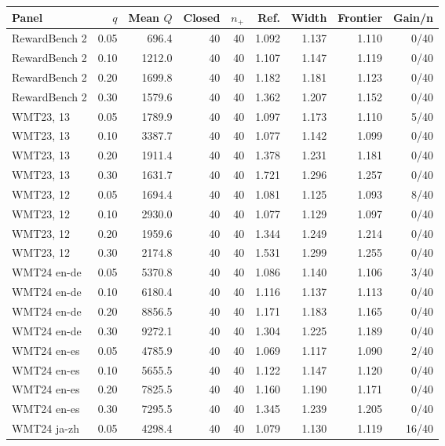 \begin{table}[t]
\centering\small
\setlength{\tabcolsep}{4pt}
\begin{tabular}{lrrrrrrrr}
\toprule
Panel & $q$ & Mean $Q$ & Closed & $n_+$ & Ref. & Width & Frontier & Gain/n \\
\midrule
RewardBench 2 & 0.05 & 696.4 & 40 & 40 & 1.092 & 1.137 & 1.110 & 0/40 \\
RewardBench 2 & 0.10 & 1212.0 & 40 & 40 & 1.107 & 1.147 & 1.119 & 0/40 \\
RewardBench 2 & 0.20 & 1699.8 & 40 & 40 & 1.182 & 1.181 & 1.123 & 0/40 \\
RewardBench 2 & 0.30 & 1579.6 & 40 & 40 & 1.362 & 1.207 & 1.152 & 0/40 \\
WMT23, 13 & 0.05 & 1789.9 & 40 & 40 & 1.097 & 1.173 & 1.110 & 5/40 \\
WMT23, 13 & 0.10 & 3387.7 & 40 & 40 & 1.077 & 1.142 & 1.099 & 0/40 \\
WMT23, 13 & 0.20 & 1911.4 & 40 & 40 & 1.378 & 1.231 & 1.181 & 0/40 \\
WMT23, 13 & 0.30 & 1631.7 & 40 & 40 & 1.721 & 1.296 & 1.257 & 0/40 \\
WMT23, 12 & 0.05 & 1694.4 & 40 & 40 & 1.081 & 1.125 & 1.093 & 8/40 \\
WMT23, 12 & 0.10 & 2930.0 & 40 & 40 & 1.077 & 1.129 & 1.097 & 0/40 \\
WMT23, 12 & 0.20 & 1959.6 & 40 & 40 & 1.344 & 1.249 & 1.214 & 0/40 \\
WMT23, 12 & 0.30 & 2174.8 & 40 & 40 & 1.531 & 1.299 & 1.255 & 0/40 \\
WMT24 en-de & 0.05 & 5370.8 & 40 & 40 & 1.086 & 1.140 & 1.106 & 3/40 \\
WMT24 en-de & 0.10 & 6180.4 & 40 & 40 & 1.116 & 1.137 & 1.113 & 0/40 \\
WMT24 en-de & 0.20 & 8856.5 & 40 & 40 & 1.171 & 1.183 & 1.165 & 0/40 \\
WMT24 en-de & 0.30 & 9272.1 & 40 & 40 & 1.304 & 1.225 & 1.189 & 0/40 \\
WMT24 en-es & 0.05 & 4785.9 & 40 & 40 & 1.069 & 1.117 & 1.090 & 2/40 \\
WMT24 en-es & 0.10 & 5655.5 & 40 & 40 & 1.122 & 1.147 & 1.120 & 0/40 \\
WMT24 en-es & 0.20 & 7825.5 & 40 & 40 & 1.160 & 1.190 & 1.171 & 0/40 \\
WMT24 en-es & 0.30 & 7295.5 & 40 & 40 & 1.345 & 1.239 & 1.205 & 0/40 \\
WMT24 ja-zh & 0.05 & 4298.4 & 40 & 40 & 1.079 & 1.130 & 1.119 & 16/40 \\

\end{tabular}
\end{table}
